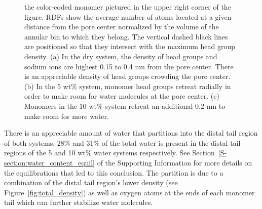\documentclass[journal=jpcbfk,manuscript=article]{achemso}
\begin{document}
\begin{figure}[!htb]
{  the color-coded monomer pictured in the upper right corner of the figure. 
  RDFs show the average number of atoms located at a given distance from the
  pore center normalized by the volume of the annular bin to which they belong.
  The vertical dashed black lines are positioned so that they intersect with 
  the maximum head group density.
  (a) In the dry system, the density of head groups and sodium ions are highest
  0.15 to 0.4 nm from the pore center. There is an appreciable density of head groups
  crowding the pore center. (b) In the 5 wt\% system, monomer head 
  groups retreat radially in order to make room for water molecules at the pore center.
  (c) Monomers in the 10 wt\% system retreat an additional 0.2 nm to make room
  for more water.}\label{fig:component_densities}
  \end{figure}
  

  There is an appreciable amount of water that partitions into the distal tail
  region of both systems. 28\% and 31\% of the total water is present in the
  distal tail regions of the 5 and 10 wt\% water systems respectively. See 
  Section~\ref{S-section:water_content_equil} of the Supporting Information 
  for more details on the equilibrations that led to this conclusion. The partition
  is due to a combination of the distal tail region's lower density (see 
  Figure~\ref{fig:total_density}) as well as oxygen atoms at the ends of each
  monomer tail which can further stabilize water molecules. 
  
  
\end{document}
